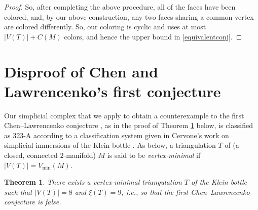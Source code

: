 \documentclass[12pt]{article}
\newtheorem{theorem}{Theorem}
\begin{document}
\begin{proof}
 So, after completing the above procedure, all of the faces have been colored, and, by our above construction, any two faces sharing a 
 common vertex are colored differently. So, our coloring is cyclic and uses at most $\left| V(T) \right| + C(M)$ colors, and hence the 
 upper bound in \eqref{equivalentconj}. 
\end{proof}

\section{Disproof of Chen and Lawrencenko's first conjecture}\label{secdisproof}
 Our simplicial complex that we apply to obtain a counterexample to the first Chen--Lawrencenko 
 conjecture \cite[Conjecture 1]{ChenLawrencenko1999}, as in the proof of Theorem \ref{theoremdisproof} below, is classified 
 as 323-A according to a classification system given 
 in Cervone's work on simplicial immersions of the {K}lein bottle \cite{Cervone1994}. 
 As below, a triangulation $T$ of (a closed, connected $2$-manifold) $M$
 is said to be \emph{vertex-minimal} if
 $\left| V(T) \right| = V_{\min}(M)$. 

\begin{theorem}\label{theoremdisproof}
 There exists a vertex-minimal triangulation $T$ of the Klein bottle such that $|V(T)| = 8$ and $\xi(T) = 9$, i.e., so that the first 
 Chen--Lawrencenko conjecture is false. 
\end{theorem}
\end{document}
